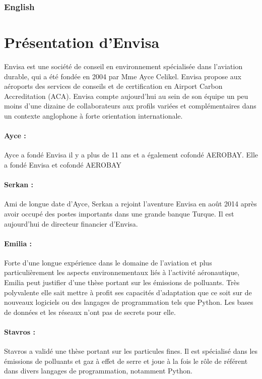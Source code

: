 \documentclass[a4paper]{article}
\begin{document}
    \subsubsection*{English}
    \lipsum[1]
    \newpage
    
    \section{Présentation d'Envisa}
    Envisa est une société de conseil en environnement spécialisée dans l'aviation durable, qui a été fondée en 2004 par Mme Ayce Celikel. Envisa propose aux aéroports des services de conseils et de certification en Airport Carbon Accreditation (ACA). Envisa compte aujourd'hui au sein de son équipe un peu moins d'une dizaine de collaborateurs aux profils variées et complémentaires dans un contexte anglophone à forte orientation internationale.
    \paragraph{Ayce :} Ayce a fondé Envisa il y a plus de 11 ans et a également cofondé AEROBAY. Elle a fondé Envisa et cofondé AEROBAY
    \paragraph{Serkan :} Ami de longue date d'Ayce, Serkan a rejoint l'aventure Envisa en août 2014 après avoir occupé des postes importants dans une grande banque Turque. Il est aujourd'hui de directeur financier d'Envisa.
    \paragraph{Emilia :}
    Forte d'une longue expérience dans le domaine de l'aviation et plus particulièrement les aspects environnementaux liés à l'activité aéronautique, Emilia peut justifier d'une thèse portant sur les émissions de polluants. Très polyvalente elle sait mettre à profit ses capacités d'adaptation que ce soit sur de nouveaux logiciels ou des langages de programmation tels que Python. Les bases de données et les réseaux n'ont pas de secrets pour elle.
    \paragraph{Stavros :}
    Stavros a validé une thèse portant sur les particules fines. Il est spécialisé dans les émissions de polluants et gaz à effet de serre et joue à la fois le rôle de référent dans divers langages de programmation, notamment Python.
\end{document}
